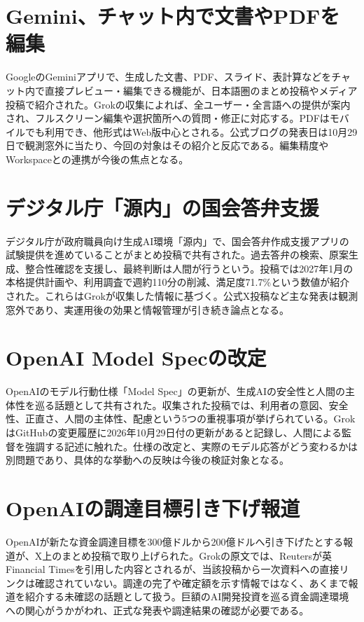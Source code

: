 \section{Gemini、チャット内で文書やPDFを編集}
GoogleのGeminiアプリで、生成した文書、PDF、スライド、表計算などをチャット内で直接プレビュー・編集できる機能が、日本語圏のまとめ投稿やメディア投稿で紹介された。Grokの収集によれば、全ユーザー・全言語への提供が案内され、フルスクリーン編集や選択箇所への質問・修正に対応する。PDFはモバイルでも利用でき、他形式はWeb版中心とされる。公式ブログの発表日は10月29日で観測窓外に当たり、今回の対象はその紹介と反応である。編集精度やWorkspaceとの連携が今後の焦点となる。

\section{デジタル庁「源内」の国会答弁支援}
デジタル庁が政府職員向け生成AI環境「源内」で、国会答弁作成支援アプリの試験提供を進めていることがまとめ投稿で共有された。過去答弁の検索、原案生成、整合性確認を支援し、最終判断は人間が行うという。投稿では2027年1月の本格提供計画や、利用調査で週約110分の削減、満足度71.7\%という数値が紹介された。これらはGrokが収集した情報に基づく。公式X投稿など主な発表は観測窓外であり、実運用後の効果と情報管理が引き続き論点となる。

\section{OpenAI Model Specの改定}
OpenAIのモデル行動仕様「Model Spec」の更新が、生成AIの安全性と人間の主体性を巡る話題として共有された。収集された投稿では、利用者の意図、安全性、正直さ、人間の主体性、配慮という5つの重視事項が挙げられている。GrokはGitHubの変更履歴に2026年10月29日付の更新があると記録し、人間による監督を強調する記述に触れた。仕様の改定と、実際のモデル応答がどう変わるかは別問題であり、具体的な挙動への反映は今後の検証対象となる。

\section{OpenAIの調達目標引き下げ報道}
OpenAIが新たな資金調達目標を300億ドルから200億ドルへ引き下げたとする報道が、X上のまとめ投稿で取り上げられた。Grokの原文では、Reutersが英Financial Timesを引用した内容とされるが、当該投稿から一次資料への直接リンクは確認されていない。調達の完了や確定額を示す情報ではなく、あくまで報道を紹介する未確認の話題として扱う。巨額のAI開発投資を巡る資金調達環境への関心がうかがわれ、正式な発表や調達結果の確認が必要である。


